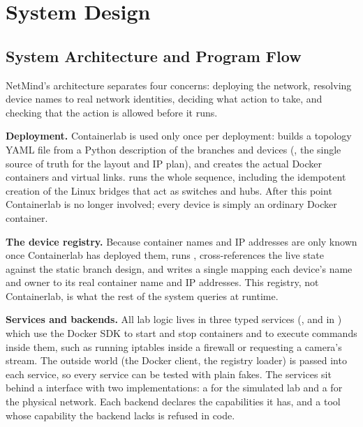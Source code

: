 \chapter{System Design}

\section{System Architecture and Program Flow}

NetMind's architecture separates four concerns: deploying the network,
resolving device names to real network identities, deciding what action to
take, and checking that the action is allowed before it runs.

\textbf{Deployment.} Containerlab is used only once per deployment:
 builds a topology YAML file from a Python
description of the branches and devices (, the single
source of truth for the layout and IP plan), and 
creates the actual Docker containers and virtual links.  runs
the whole sequence, including the idempotent creation of the Linux bridges
that act as switches and hubs. After this point Containerlab is no longer
involved; every device is simply an ordinary Docker container.

\textbf{The device registry.} Because container names and IP addresses are
only known once Containerlab has deployed them, 
runs , cross-references the live state against the
static branch design, and writes a single  mapping each
device's name and owner to its real container name and IP addresses. This
registry, not Containerlab, is what the rest of the system queries at runtime.

\textbf{Services and backends.} All lab logic lives in three typed services
(,  and  in
) which use the Docker SDK to start and stop containers
and to execute commands inside them, such as running iptables inside a
firewall or requesting a camera's stream. The outside world (the Docker
client, the registry loader) is passed into each service, so every service
can be tested with plain fakes. The services sit behind a
 interface with two implementations: a
 for the simulated lab and a
 for the physical network. Each backend declares the
capabilities it has, and a tool whose capability the backend lacks is
refused in code.

